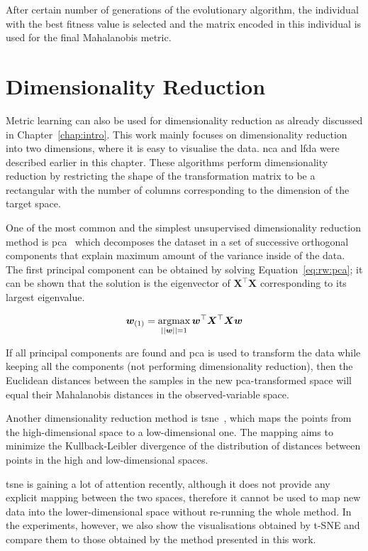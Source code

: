 \documentclass[12pt,a4paper]{report}
\begin{document}
After certain number of generations of the evolutionary algorithm, the individual with the best fitness value is selected and the matrix encoded in this individual is used for the final Mahalanobis metric.

\section{Dimensionality Reduction}

Metric learning can also be used for dimensionality reduction as already discussed in Chapter~\ref{chap:intro}. This work mainly focuses on dimensionality reduction into two dimensions, where it is easy to visualise the data. \Ac{nca} and \ac{lfda} were described earlier in this chapter. These algorithms perform dimensionality reduction by restricting the shape of the transformation matrix to be a rectangular with the number of columns corresponding to the dimension of the target space.

One of the most common and the simplest unsupervised dimensionality reduction method is \ac{pca}~\citep{jolliffe2002principal} which decomposes the dataset in a set of successive orthogonal components that explain maximum amount of the variance inside of the data. The first principal component can be obtained by solving Equation~\ref{eq:rw:pca}; it can be shown that the solution is the eigenvector of $\bm{X}^\top\bm{X}$ corresponding to its largest eigenvalue.

\begin{equation} 
\bm{w}_{(1)} = \operatorname*{argmax}_{||\bm{w}||=1} \bm{w}^\top\bm{X}^\top\bm{X}\bm{w} \label{eq:rw:pca}
\end{equation}

If all principal components are found and \ac{pca} is used to transform the data while keeping all the components (not performing dimensionality reduction), then the Euclidean distances between the samples in the new \ac{pca}-transformed space will equal their Mahalanobis distances in the observed-variable space.

Another dimensionality reduction method is \ac{tsne}~\citep{maaten2008visualizing}, which maps the points from the high-dimensional space to a low-dimensional one. The mapping aims to minimize the Kullback-Leibler divergence of the distribution of distances between points in the high and low-dimensional spaces.

\ac{tsne} is gaining a lot of attention recently, although it does not provide any explicit mapping between the two spaces, therefore it cannot be used to map new data into the lower-dimensional space without re-running the whole method. In the experiments, however, we also show the visualisations obtained by t-SNE and compare them to those obtained by the method presented in this work.
\end{document}
